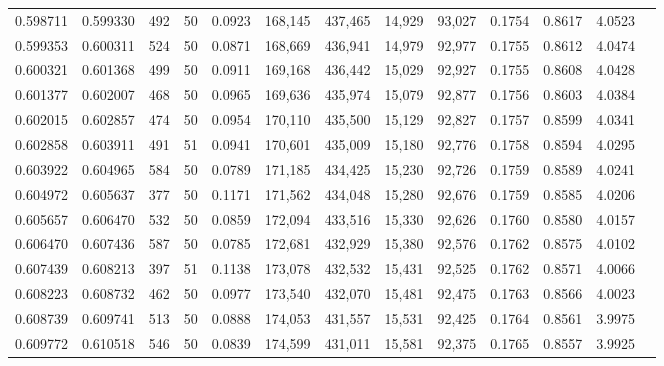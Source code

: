 \begin{tabular}{rrrrrrrrrrrrr}
0.598711 & 0.599330 &   492 &  50 &                                     0.0923 & 168,145 & 437,465 &  14,929 &  93,027 & 0.1754 & 0.8617 & 4.0523 \\
0.599353 & 0.600311 &   524 &  50 &                                     0.0871 & 168,669 & 436,941 &  14,979 &  92,977 & 0.1755 & 0.8612 & 4.0474 \\
0.600321 & 0.601368 &   499 &  50 &                                     0.0911 & 169,168 & 436,442 &  15,029 &  92,927 & 0.1755 & 0.8608 & 4.0428 \\
0.601377 & 0.602007 &   468 &  50 &                                     0.0965 & 169,636 & 435,974 &  15,079 &  92,877 & 0.1756 & 0.8603 & 4.0384 \\
0.602015 & 0.602857 &   474 &  50 &                                     0.0954 & 170,110 & 435,500 &  15,129 &  92,827 & 0.1757 & 0.8599 & 4.0341 \\
0.602858 & 0.603911 &   491 &  51 &                                     0.0941 & 170,601 & 435,009 &  15,180 &  92,776 & 0.1758 & 0.8594 & 4.0295 \\
0.603922 & 0.604965 &   584 &  50 &                                     0.0789 & 171,185 & 434,425 &  15,230 &  92,726 & 0.1759 & 0.8589 & 4.0241 \\
0.604972 & 0.605637 &   377 &  50 &                                     0.1171 & 171,562 & 434,048 &  15,280 &  92,676 & 0.1759 & 0.8585 & 4.0206 \\
0.605657 & 0.606470 &   532 &  50 &                                     0.0859 & 172,094 & 433,516 &  15,330 &  92,626 & 0.1760 & 0.8580 & 4.0157 \\
0.606470 & 0.607436 &   587 &  50 &                                     0.0785 & 172,681 & 432,929 &  15,380 &  92,576 & 0.1762 & 0.8575 & 4.0102 \\
0.607439 & 0.608213 &   397 &  51 &                                     0.1138 & 173,078 & 432,532 &  15,431 &  92,525 & 0.1762 & 0.8571 & 4.0066 \\
0.608223 & 0.608732 &   462 &  50 &                                     0.0977 & 173,540 & 432,070 &  15,481 &  92,475 & 0.1763 & 0.8566 & 4.0023 \\
0.608739 & 0.609741 &   513 &  50 &                                     0.0888 & 174,053 & 431,557 &  15,531 &  92,425 & 0.1764 & 0.8561 & 3.9975 \\
0.609772 & 0.610518 &   546 &  50 &                                     0.0839 & 174,599 & 431,011 &  15,581 &  92,375 & 0.1765 & 0.8557 & 3.9925 \\

\end{tabular}
